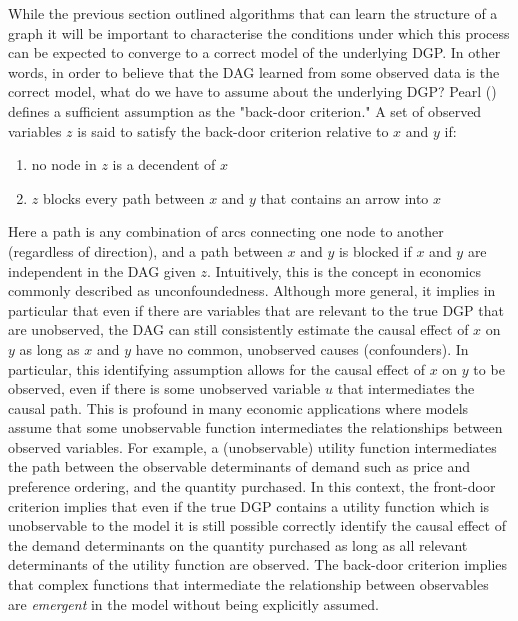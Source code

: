 \documentclass{article}
\begin{document}
While the previous section outlined algorithms that can learn the structure of a graph it will be important to characterise the conditions under which this process can be expected to converge to a correct model of the underlying DGP. In other words, in order to believe that the DAG learned from some observed data is the correct model, what do we have to assume about the underlying DGP? Pearl (\citeyear{pearl2009causality}) defines a sufficient assumption as the "back-door criterion." A set of observed variables $z$ is said to satisfy the back-door criterion relative to $x$ and $y$ if:

\begin{enumerate}
  \item no node in $z$ is a decendent of $x$
  \item $z$ blocks every path between $x$ and $y$ that contains an arrow into $x$
\end{enumerate}

Here a path is any combination of arcs connecting one node to another (regardless of direction), and a path between $x$ and $y$ is blocked if $x$ and $y$ are independent in the DAG given $z$. Intuitively, this is the concept in economics commonly described as unconfoundedness. Although more general, it implies in particular that even if there are variables that are relevant to the true DGP that are unobserved, the DAG can still consistently estimate the causal effect of $x$ on $y$ as long as $x$ and $y$ have no common, unobserved causes (confounders). In particular, this identifying assumption allows for the causal effect of $x$ on $y$ to be observed, even if there is some unobserved variable $u$ that intermediates the causal path. This is profound in many economic applications where models assume that some unobservable function intermediates the relationships between observed variables. For example, a (unobservable) utility function intermediates the path between the observable determinants of demand such as price and preference ordering, and the quantity purchased. In this context, the front-door criterion implies that even if the true DGP contains a utility function which is unobservable to the model it is still possible correctly identify the causal effect of the demand determinants on the quantity purchased as long as all relevant determinants of the utility function are observed. The back-door criterion implies that complex functions that intermediate the relationship between observables are \textit{emergent} in the model without being explicitly assumed.
\end{document}
